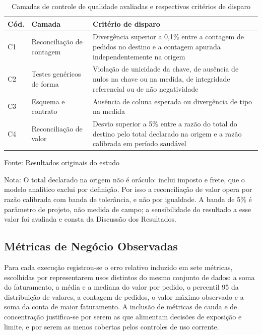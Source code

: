 \documentclass[11pt,a4paper]{article}
\newcommand{\fonteprop}[1]{%
  \par\vspace{2pt}%
  {\singlespacing\fontsize{11}{13}\selectfont\RaggedRight Fonte: #1\par}}
\newcommand{\fonteoriginal}{\fonteprop{Resultados originais do estudo}}
\newcommand{\notatab}[1]{%
  \par{\singlespacing\fontsize{11}{13}\selectfont\RaggedRight Nota: #1\par}}
\begin{document}
\begin{table}[htbp]
\centering
\caption{Camadas de controle de qualidade avaliadas e respectivos critérios de disparo}
\label{tab:controles}
\begin{singlespace}
\fontsize{10}{12}\selectfont
\begin{tabular}{@{}p{0.8cm}p{5.2cm}p{8.6cm}@{}}
\toprule
\textbf{Cód.} & \textbf{Camada} & \textbf{Critério de disparo} \\
\midrule
C1 & Reconciliação de contagem & Divergência superior a 0,1\% entre a contagem de pedidos no destino e a contagem apurada independentemente na origem \\
C2 & Testes genéricos de forma & Violação de unicidade da chave, de ausência de nulos na chave ou na medida, de integridade referencial ou de não negatividade \\
C3 & Esquema e contrato & Ausência de coluna esperada ou divergência de tipo na medida \\
C4 & Reconciliação de valor & Desvio superior a 5\% entre a razão do total do destino pelo total declarado na origem e a razão calibrada em período saudável \\
\bottomrule
\end{tabular}
\end{singlespace}
\fonteoriginal
\notatab{O total declarado na origem não é oráculo: inclui imposto e frete,
que o modelo analítico exclui por definição. Por isso a reconciliação de
valor opera por razão calibrada com banda de tolerância, e não por
igualdade. A banda de 5\% é parâmetro de projeto, não medida de campo; a
sensibilidade do resultado a esse valor foi avaliada e consta da Discussão
dos Resultados.}
\end{table}

\subsection{Métricas de Negócio Observadas}

Para cada execução registrou-se o erro relativo induzido em sete métricas,
escolhidas por representarem usos distintos do mesmo conjunto de dados: a
soma do faturamento, a média e a mediana do valor por pedido, o percentil
95 da distribuição de valores, a contagem de pedidos, o valor máximo
observado e a soma da conta de maior faturamento. A inclusão de métricas de
cauda e de concentração justifica-se por serem as que alimentam decisões de
exposição e limite, e por serem as menos cobertas pelos controles de uso
corrente.
\end{document}
